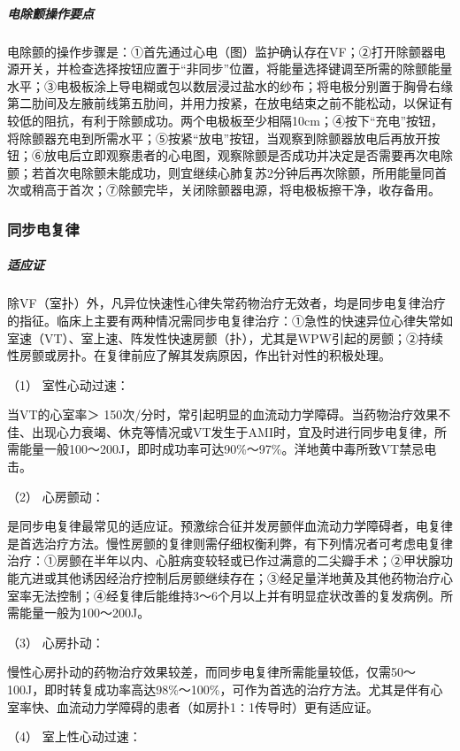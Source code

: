 \subparagraph{电除颤操作要点}

电除颤的操作步骤是：①首先通过心电（图）监护确认存在VF；②打开除颤器电源开关，并检查选择按钮应置于“非同步”位置，将能量选择键调至所需的除颤能量水平；③电极板涂上导电糊或包以数层浸过盐水的纱布；将电极分别置于胸骨右缘第二肋间及左腋前线第五肋间，并用力按紧，在放电结束之前不能松动，以保证有较低的阻抗，有利于除颤成功。两个电极板至少相隔10cm；④按下“充电”按钮，将除颤器充电到所需水平；⑤按紧“放电”按钮，当观察到除颤器放电后再放开按钮；⑥放电后立即观察患者的心电图，观察除颤是否成功并决定是否需要再次电除颤；若首次电除颤未能成功，则宜继续心肺复苏2分钟后再次除颤，所用能量同首次或稍高于首次；⑦除颤完毕，关闭除颤器电源，将电极板擦干净，收存备用。

\subsubsection{同步电复律}

\subparagraph{适应证}

除VF（室扑）外，凡异位快速性心律失常药物治疗无效者，均是同步电复律治疗的指征。临床上主要有两种情况需同步电复律治疗：①急性的快速异位心律失常如室速（VT）、室上速、阵发性快速房颤（扑），尤其是WPW引起的房颤；②持续性房颤或房扑。在复律前应了解其发病原因，作出针对性的积极处理。

\hypertarget{text00373.htmlux5cux23CHP16-4-4-1-1}{}
（1） 室性心动过速：

当VT的心室率＞
150次/分时，常引起明显的血流动力学障碍。当药物治疗效果不佳、出现心力衰竭、休克等情况或VT发生于AMI时，宜及时进行同步电复律，所需能量一般100～200J，即时成功率可达90\%～97\%。洋地黄中毒所致VT禁忌电击。

\hypertarget{text00373.htmlux5cux23CHP16-4-4-1-2}{}
（2） 心房颤动：

是同步电复律最常见的适应证。预激综合征并发房颤伴血流动力学障碍者，电复律是首选治疗方法。慢性房颤的复律则需仔细权衡利弊，有下列情况者可考虑电复律治疗：①房颤在半年以内、心脏病变较轻或已作过满意的二尖瓣手术；②甲状腺功能亢进或其他诱因经治疗控制后房颤继续存在；③经足量洋地黄及其他药物治疗心室率无法控制；④经复律后能维持3～6个月以上并有明显症状改善的复发病例。所需能量一般为100～200J。

\hypertarget{text00373.htmlux5cux23CHP16-4-4-1-3}{}
（3） 心房扑动：

慢性心房扑动的药物治疗效果较差，而同步电复律所需能量较低，仅需50～100J，即时转复成功率高达98\%～100\%，可作为首选的治疗方法。尤其是伴有心室率快、血流动力学障碍的患者（如房扑1∶1传导时）更有适应证。

\hypertarget{text00373.htmlux5cux23CHP16-4-4-1-4}{}
（4） 室上性心动过速：

